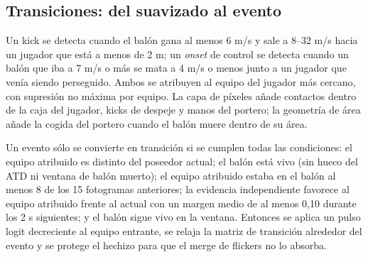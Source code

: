 \documentclass[10pt,a4paper]{article}
\begin{document}
\subsection{Transiciones: del suavizado al evento}

Un kick se detecta cuando el balón gana al menos 6 m/s y sale a 8--32 m/s hacia un jugador que
está a menos de 2 m; un \emph{onset} de control se detecta cuando un balón que iba a 7 m/s o más
se mata a 4 m/s o menos junto a un jugador que venía siendo perseguido. Ambos se atribuyen al
equipo del jugador más cercano, con supresión no máxima por equipo. La capa de píxeles añade
contactos dentro de la caja del jugador, kicks de despeje y manos del portero; la geometría de
área añade la cogida del portero cuando el balón muere dentro de su área.

Un evento sólo se convierte en transición si se cumplen todas las condiciones: el equipo
atribuido es distinto del poseedor actual; el balón está vivo (sin hueco del ATD ni ventana de
balón muerto); el equipo atribuido estaba en el balón al menos 8 de los 15 fotogramas anteriores;
la evidencia independiente favorece al equipo atribuido frente al actual con un margen medio de
al menos 0,10 durante los 2 s siguientes; y el balón sigue vivo en la ventana. Entonces se aplica
un pulso logit decreciente al equipo entrante, se relaja la matriz de transición alrededor del
evento y se protege el hechizo para que el merge de flickers no lo absorba.
\end{document}
